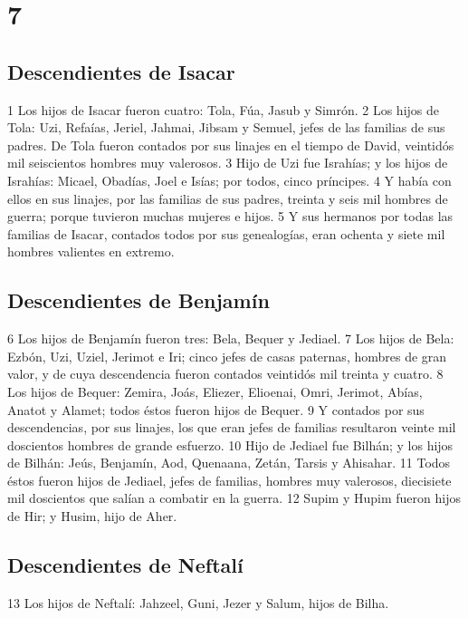\chapter{7}

\section*{Descendientes de Isacar}

1 Los hijos de Isacar fueron cuatro: Tola, Fúa, Jasub y Simrón.
2 Los hijos de Tola: Uzi, Refaías, Jeriel, Jahmai, Jibsam y Semuel, jefes de las familias de sus padres. De Tola fueron contados por sus linajes en el tiempo de David, veintidós mil seiscientos hombres muy valerosos.
3 Hijo de Uzi fue Israhías; y los hijos de Israhías: Micael, Obadías, Joel e Isías; por todos, cinco príncipes.
4 Y había con ellos en sus linajes, por las familias de sus padres, treinta y seis mil hombres de guerra; porque tuvieron muchas mujeres e hijos.
5 Y sus hermanos por todas las familias de Isacar, contados todos por sus genealogías, eran ochenta y siete mil hombres valientes en extremo.

\section*{Descendientes de Benjamín}

6 Los hijos de Benjamín fueron tres: Bela, Bequer y Jediael.
7 Los hijos de Bela: Ezbón, Uzi, Uziel, Jerimot e Iri; cinco jefes de casas paternas, hombres de gran valor, y de cuya descendencia fueron contados veintidós mil treinta y cuatro.
8 Los hijos de Bequer: Zemira, Joás, Eliezer, Elioenai, Omri, Jerimot, Abías, Anatot y Alamet; todos éstos fueron hijos de Bequer.
9 Y contados por sus descendencias, por sus linajes, los que eran jefes de familias resultaron veinte mil doscientos hombres de grande esfuerzo.
10 Hijo de Jediael fue Bilhán; y los hijos de Bilhán: Jeús, Benjamín, Aod, Quenaana, Zetán, Tarsis y Ahisahar.
11 Todos éstos fueron hijos de Jediael, jefes de familias, hombres muy valerosos, diecisiete mil doscientos que salían a combatir en la guerra.
12 Supim y Hupim fueron hijos de Hir; y Husim, hijo de Aher.

\section*{Descendientes de Neftalí}

13 Los hijos de Neftalí: Jahzeel, Guni, Jezer y Salum, hijos de Bilha.

